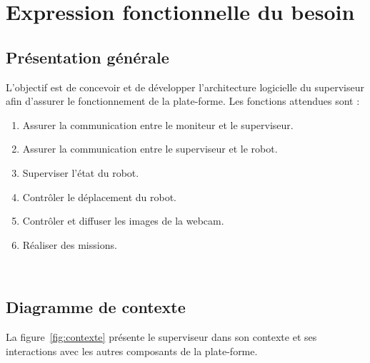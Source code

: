 \section{Expression fonctionnelle du besoin}

\subsection{Présentation générale}

L'objectif est de concevoir et de développer l'architecture logicielle du superviseur afin d'assurer le fonctionnement de la plate-forme. Les fonctions attendues sont :
\begin{enumerate}
	\item Assurer la communication entre le moniteur et le superviseur.
	\item Assurer la communication entre le superviseur et le robot.
	\item Superviser l'état du robot.
	\item Contrôler le déplacement du robot.
	\item Contrôler et diffuser les images de la webcam.
	\item Réaliser des missions.\\
\end{enumerate}

\noindent{}\\

  \subsection{Diagramme de contexte}

La figure~\ref{fig:contexte} présente le superviseur dans son contexte et ses interactions avec les autres composants de la plate-forme.

